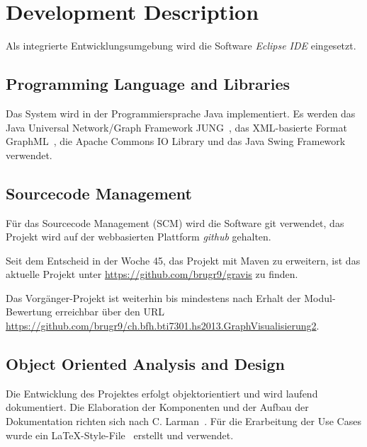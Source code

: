 \section{Development Description}
\label{sec:Development Description}
% 
Als integrierte Entwicklungsumgebung wird die Software \textit{Eclipse IDE} eingesetzt.
% 
\subsection{Programming Language and Libraries}
\label{subsec:Programming Language and Libraries}
Das System wird in der Programmiersprache Java implementiert. Es werden das Java Universal Network/Graph Framework JUNG~\cite{jung:2013}, das XML-basierte Format GraphML~\cite{graphml:2013}, die Apache Commons IO Library und das Java Swing Framework verwendet.
% 
\subsection{Sourcecode Management}
\label{subsec:Sourcecode Management}
F\"ur das Sourcecode Management (SCM) wird die Software git verwendet, das Projekt wird auf der webbasierten Plattform \textit{github} gehalten.

Seit dem Entscheid in der Woche 45, das Projekt mit Maven zu erweitern, ist das aktuelle Projekt unter \url{https://github.com/brugr9/gravis} zu finden.

Das Vorg\"anger-Projekt ist weiterhin bis mindestens nach Erhalt der Modul-Bewertung erreichbar \"uber den URL \url{https://github.com/brugr9/ch.bfh.bti7301.hs2013.GraphVisualisierung2}.
% 
\subsection{Object Oriented Analysis and Design}
\label{subsec:Object Oriented Analysis and Design}
Die Entwicklung des Projektes erfolgt objektorientiert und wird laufend dokumentiert. Die Elaboration der Komponenten und der Aufbau der Dokumentation richten sich nach C. Larman~\cite{larmann:2004}. F\"ur die Erarbeitung der Use Cases wurde ein \LaTeX-Style-File~\cite{bruggmann:2013} erstellt und verwendet.